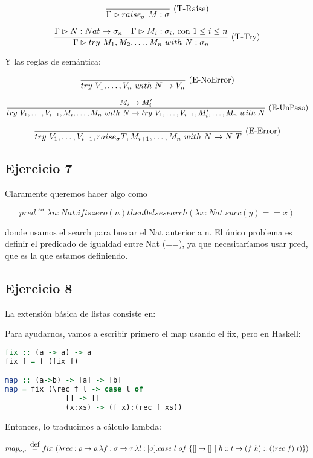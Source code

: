 \[\deriv{}{\Gtipa{raise_\sigma\ M}{\sigma}}{T-Raise}\]

\[\frac{\Gamma \rhd N : Nat \to \sigma_n\quad \Gamma \rhd M_i : \sigma_i\text{, con $1 \leq i \leq n$}}{\Gamma \rhd try\ M_1, M_2, \dots, M_n\ with\ N : \sigma_n}\ \text{(T-Try)}\]

Y las reglas de semántica:

\[\frac{}{try\ V_1, \dots, V_n\ with\ N \to V_n}\ \text{(E-NoError)}\]

\[\frac{M_i \to M_i'}{try\ V_1, \dots, V_{i-1}, M_i ,\dots, M_n\ with\ N \to try\ V_1, \dots, V_{i-1}, M_i' ,\dots, M_n\ with\ N}\ \text{(E-UnPaso)}\]

\[\deriv{}{try\ V_1, \dots, V_{i-1}, raise_\sigma T , M_{i+1},\dots, M_n\ with\ N \to N\ T}{E-Error}\]

\subsection*{Ejercicio 7}

Claramente queremos hacer algo como

\[pred \eqdef \lambda n : Nat. if iszero(n) then 0 else search (\lambda x: Nat. succ(y) == x)\]

donde usamos el search para buscar el Nat anterior a n. El único problema es definir el predicado de igualdad entre Nat (==), ya que necesitaríamos usar pred, que es la que estamos definiendo.


\subsection*{Ejercicio 8} La extensión básica de listas consiste en:


Para ayudarnos, vamos a escribir primero el map usando el fix, pero en Haskell:

\begin{lstlisting}[language=Haskell]
fix :: (a -> a) -> a
fix f = f (fix f)

map :: (a->b) -> [a] -> [b]
map = fix (\rec f l -> case l of
              [] -> []
              (x:xs) -> (f x):(rec f xs))
\end{lstlisting}

Entonces, lo traducimos a cálculo lambda:

\[map_{\sigma,\tau} \eqdef fix\ (\abs{rec}{\rho\to\rho}{\abs{f}{\sigma\to\tau}{\abs{l}{[\sigma]}{case\ l\ of\ \{[] \to [] \vert h::t \to (f\ h)::((rec\ f)\ t)\}}}}) \]

